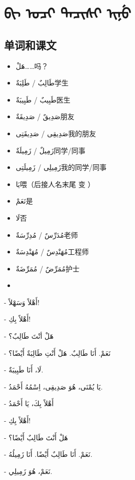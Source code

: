 \chapter{\textmongolian{ᠪᡳ ᠣᠴᡳ ᡨᠠᠴᡳᠰᡳ ᡳᠨᡠ}}

\section{ 单词和课文}

\begin{multicols}{2}
    \begin{itemize}
        \item \ac{هَلْ}{……吗？}
        \item \ac{طَالِبٌ / طَلِبَةٌ}{学生}
        \item \ac{طَبِيبٌ / طَبِيبَةٌ}{医生}
        \item \ac{صَدِيقٌ / صَدِيقَةٌ}{朋友}
        \item \ac{صَدِيقِى / صَدِيقَتِى}{我的朋友}
        \item \ac{زَمِيلٌ / زَمِيلَةٌ}{同学/同事}
        \item \ac{زَمِيلِى / زَمِيلَتِى}{我的同学/同事}
        \item \ac{يَا}{喂（后接人名末尾  变 ）}
        \item \ac{نَعَمْ}{是}
        \item \ac{لَا}{否}
        \item \ac{مُدَرِّسٌ / مُدِرِّسَةٌ}{老师}
        \item \ac{مُهَنْدِسٌ / مُهَنْدِسَةٌ}{工程师}
        \item \ac{مُمَرِّضٌ / مُمَرِّضَةٌ}{护士}
        \item []
    \end{itemize}
\end{multicols}


\begin{Arabic}
    - أَهْلاً وَسَهْلاً!

    - أَهْلاً بِكِ!

    - هَلْ أنْتَ طَالِبٌ؟

    - نَعَمْ. أَنَا طَالِبٌ. هَلْ أَنْتِ طَالِبَةٌ أَيْضًا؟

    - لَا، أَنَا طَبِيبَةٌ.

    - يَا يُمْنَى، هُوَ صَدِيقِى، اِسْمُهُ أَحْمَدُ.

    - أَهْلاً بِكَ، يَا أَحْمَدُ

    - أَهْلاً بِكِ!

    - هَلْ أَنْتَ طَالِبٌ أَيْضًا؟

    - نَعَمْ. أَنَا طَالِبٌ أَيْضًا. أَنَا زَمِيلُهُ.

    - نَعَمْ، هُوَ زَمِيلِي.
\end{Arabic}

